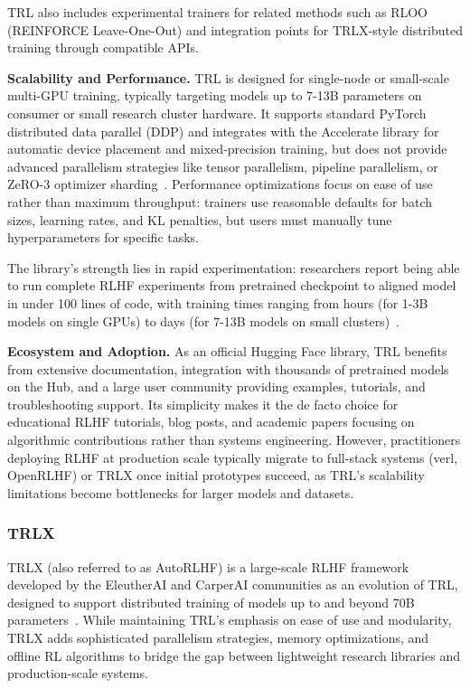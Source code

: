 \documentclass[conference]{IEEEtran}
\begin{document}
TRL also includes experimental trainers for related methods such as RLOO (REINFORCE Leave-One-Out) and integration points for TRLX-style distributed training through compatible APIs.

\textbf{Scalability and Performance.} TRL is designed for single-node or small-scale multi-GPU training, typically targeting models up to 7-13B parameters on consumer or small research cluster hardware. It supports standard PyTorch distributed data parallel (DDP) and integrates with the Accelerate library for automatic device placement and mixed-precision training, but does not provide advanced parallelism strategies like tensor parallelism, pipeline parallelism, or ZeRO-3 optimizer sharding~\cite{trl-github}. Performance optimizations focus on ease of use rather than maximum throughput: trainers use reasonable defaults for batch sizes, learning rates, and KL penalties, but users must manually tune hyperparameters for specific tasks.

The library's strength lies in rapid experimentation: researchers report being able to run complete RLHF experiments from pretrained checkpoint to aligned model in under 100 lines of code, with training times ranging from hours (for 1-3B models on single GPUs) to days (for 7-13B models on small clusters)~\cite{trl-examples}.

\textbf{Ecosystem and Adoption.} As an official Hugging Face library, TRL benefits from extensive documentation, integration with thousands of pretrained models on the Hub, and a large user community providing examples, tutorials, and troubleshooting support. Its simplicity makes it the de facto choice for educational RLHF tutorials, blog posts, and academic papers focusing on algorithmic contributions rather than systems engineering. However, practitioners deploying RLHF at production scale typically migrate to full-stack systems (verl, OpenRLHF) or TRLX once initial prototypes succeed, as TRL's scalability limitations become bottlenecks for larger models and datasets.


\subsubsection{TRLX}

TRLX (also referred to as AutoRLHF) is a large-scale RLHF framework developed by the EleutherAI and CarperAI communities as an evolution of TRL, designed to support distributed training of models up to and beyond 70B parameters~\cite{trlx-paper, trlx-blog}. While maintaining TRL's emphasis on ease of use and modularity, TRLX adds sophisticated parallelism strategies, memory optimizations, and offline RL algorithms to bridge the gap between lightweight research libraries and production-scale systems.
\end{document}
